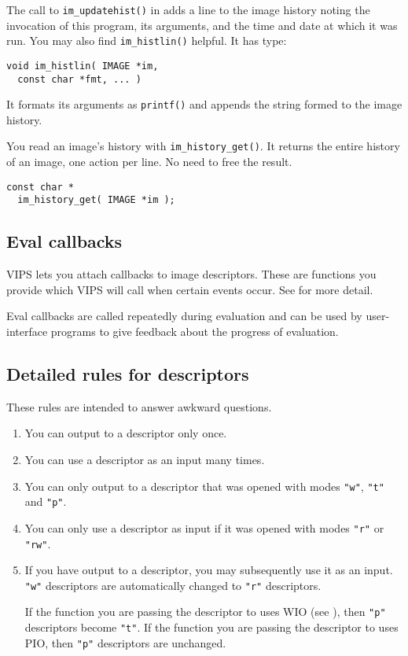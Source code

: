 The call to \verb+im_updatehist()+ in  adds a line to the
image history noting the invocation of this program, its arguments, and the
time and date at which it was run.  You may also find \verb+im_histlin()+
helpful. It has type:

\begin{verbatim}
void im_histlin( IMAGE *im, 
  const char *fmt, ... )
\end{verbatim}

\noindent
It formats its arguments as \verb+printf()+ and appends the string formed
to the image history.

You read an image's history with \verb+im_history_get()+. It returns the
entire history of an image, one action per line. No need to free the result.

\begin{verbatim}
const char *
  im_history_get( IMAGE *im ); 
\end{verbatim}

\subsection{Eval callbacks}
\label{sec:eval}

VIPS lets you attach callbacks to image descriptors. These are functions
you provide which VIPS will call when certain events occur. See
 for more detail.

Eval callbacks are called repeatedly during evaluation and can be used by
user-interface programs to give feedback about the progress of evaluation.

\subsection{Detailed rules for descriptors}

These rules are intended to answer awkward questions. 

\begin{enumerate}

\item
You can output to a descriptor only once.

\item
You can use a descriptor as an input many times.

\item
You can only output to a descriptor that was opened with modes \verb+"w"+,
\verb+"t"+ and \verb+"p"+.

\item
You can only use a descriptor as input if it was opened with modes \verb+"r"+
or \verb+"rw"+.

\item
If you have output to a descriptor, you may subsequently use it as an
input. \verb+"w"+ descriptors are automatically changed to \verb+"r"+
descriptors. 

If the function you are passing the descriptor to uses WIO (see
), then \verb+"p"+ descriptors become \verb+"t"+.
If the function you are passing the descriptor to uses PIO, then \verb+"p"+
descriptors are unchanged.

\end{enumerate}

